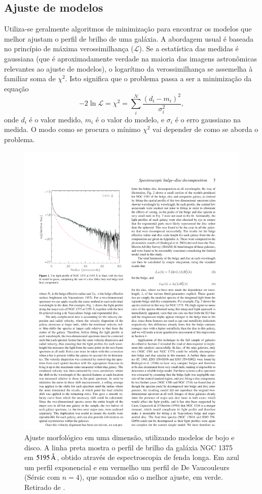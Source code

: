\subsection{Ajuste de modelos}
\label{sec:morph:comp:ajuste}

Utiliza-se geralmente algoritmos de minimização para encontrar os modelos que
melhor ajustam o perfil de brilho de uma galáxia. A abordagem usual é baseada no
princípio de máxima verossimilhança ($\mathcal{L}$). Se a estatística das
medidas é gaussiana (que é aproximadamente verdade na maioria das imagens
astronômicas relevantes ao ajuste de modelos), o logarítmo da verossimilhança se
assemelha à familiar soma de $\chi^2$\citep[seção 4.1.2]{Erwin2015}. Isto
significa que o problema passa a ser a minimização da equação
\begin{equation*}
-2\ln\mathcal{L} = \chi^2 = \sum_i^N \frac{\left(d_i -
m_i\right)^2}{\sigma_i^2},
\end{equation*}
onde $d_i$ é o valor medido, $m_i$ é o valor do modelo, e $\sigma_i$ é o erro
gaussiano na medida. O modo como se procura o mínimo $\chi^2$ vai depender de
como se aborda o problema.

\begin{figure}
	\includegraphics{figuras/johnston-decomp}
	\caption[Ajuste morfológico em uma dimensão] {Ajuste morfológico
	em uma dimensão, utilizando modelos de bojo e disco. A linha preta mostra o
	perfil de brilho da galáxia NGC 1375 em $5195\,\text{\normalfont\AA}$, obtido através de
	espectroscopia de fenda longa. Em azul um perfil exponencial e em vermelho um
	perfil de De Vaucouleurs (Sérsic com $n=4$), que somados são o melhor ajuste,
	em verde. Retirado de \citet{Johnston2012}.}
	\label{fig:decompJohnston}
\end{figure}

